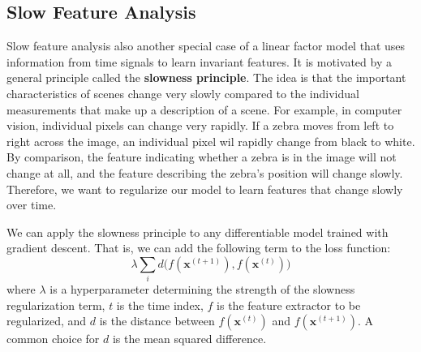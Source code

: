 \subsection{Slow Feature Analysis}

  Slow feature analysis also another special case of a linear factor model that uses information from time signals to learn invariant features. It is motivated by a general principle called the \textbf{slowness principle}. The idea is that the important characteristics of scenes change very slowly compared to the individual measurements that make up a description of a scene. For example, in computer vision, individual pixels can change very rapidly. If a zebra moves from left to right across the image, an individual pixel wil rapidly change from black to white. By comparison, the feature indicating whether a zebra is in the image will not change at all, and the feature describing the zebra's position will change slowly. Therefore, we want to regularize our model to learn features that change slowly over time.  

  We can apply the slowness principle to any differentiable model trained with gradient descent. That is, we can add the following term to the loss function: 
  \begin{equation}
    \lambda \sum_i d\big( f(\mathbf{x}^{(t+1)}), f(\mathbf{x}^{(t)}) \big)
  \end{equation}
  where $\lambda$ is a hyperparameter determining the strength of the slowness regularization term, $t$ is the time index, $f$ is the feature extractor to be regularized, and $d$ is the distance between $f(\mathbf{x}^{(t)})$ and $f(\mathbf{x}^{(t+1)})$. A common choice for $d$ is the mean squared difference. 

